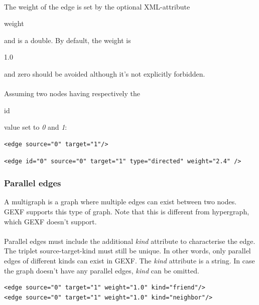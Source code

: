 \documentclass[a4paper,10pt]{article}
\begin{document}
\paragraph{}
The weight of the edge is set by the optional XML-attribute \begin{footnotesize}weight\end{footnotesize} and is a double. By default, the weight is \begin{footnotesize}1.0\end{footnotesize} and zero should be avoided although it's not explicitly forbidden.

\paragraph{}
Assuming two nodes having respectively the \begin{footnotesize}id\end{footnotesize} value set to \textit{0} and \textit{1}:

\lstset{ style=gexf }
\begin{lstlisting}[caption={An edge!},label=anEdge]
<edge source="0" target="1"/>
\end{lstlisting}

\lstset{ style=gexf }
\begin{lstlisting}[caption={A more complete edge},label=aMoreEdge]
<edge id="0" source="0" target="1" type="directed" weight="2.4" />
\end{lstlisting}

\subsubsection{Parallel edges}

A multigraph is a graph where multiple edges can exist between two nodes.
GEXF supports this type of graph.
Note that this is different from hypergraph, which GEXF doesn't support.

\paragraph{}
Parallel edges must include the additional \textit{kind} attribute to characterise the edge. The triplet source-target-kind must still be unique. In other words, only parallel edges of different kinds can exist in GEXF. The \textit{kind} attribute is a string. In case the graph doesn't have any parallel edges, \textit{kind} can be omitted.

\lstset{ style=gexf }
\begin{lstlisting}[caption={Parallel edges},label=paralelEdge]
<edge source="0" target="1" weight="1.0" kind="friend"/>
<edge source="0" target="1" weight="1.0" kind="neighbor"/>
\end{lstlisting}
\end{document}
